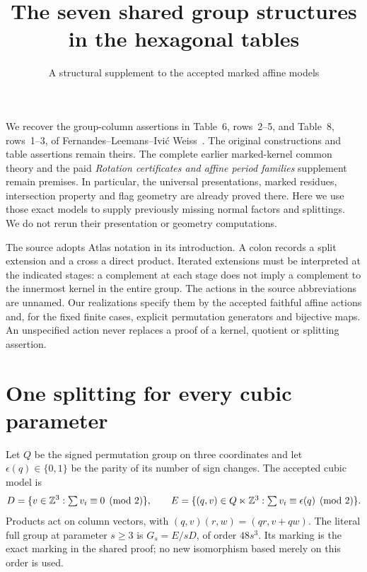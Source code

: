 \documentclass[11pt]{article}
\title{The seven shared group structures in the hexagonal tables}
\author{A structural supplement to the accepted marked affine models}
\date{}
\begin{document}
\maketitle

We recover the group-column assertions in Table~6, rows~2--5, and
Table~8, rows~1--3, of Fernandes--Leemans--Ivi\'c Weiss~\cite{hex}.
The original constructions and table assertions remain theirs. The
complete earlier marked-kernel common theory and the paid \emph{Rotation
certificates and affine period families} supplement remain premises.
In particular, the universal presentations, marked residues, intersection
property and flag geometry are already proved there. Here we use those
exact models to supply previously missing normal factors and splittings.
We do not rerun their presentation or geometry computations.

The source adopts Atlas notation in its introduction. A colon records a
split extension and a cross a direct product. Iterated extensions must
be interpreted at the indicated stages: a complement at each stage does
not imply a complement to the innermost kernel in the entire group.
The actions in the source abbreviations are unnamed. Our realizations
specify them by the accepted faithful affine actions and, for the fixed
finite cases, explicit permutation generators and bijective maps.
An unspecified action never replaces a proof of a kernel, quotient or
splitting assertion.

\section{One splitting for every cubic parameter}
Let $Q$ be the signed permutation group on three coordinates and let
$\epsilon(q)\in\{0,1\}$ be the parity of its number of sign changes.
The accepted cubic model is
\[
 D=\{v\in\mathbb Z^3:\textstyle\sum v_i\equiv0\pmod2\},\qquad
 E=\{(q,v)\in Q\ltimes\mathbb Z^3:\textstyle\sum v_i\equiv\epsilon(q)\pmod2\}.
\]
Products act on column vectors, with
$(q,v)(r,w)=(qr,v+qw)$. The literal full group at parameter $s\ge3$
is $G_s=E/sD$, of order $48s^3$. Its marking is the exact marking in
the shared proof; no new isomorphism based merely on this order is used.
\end{document}
